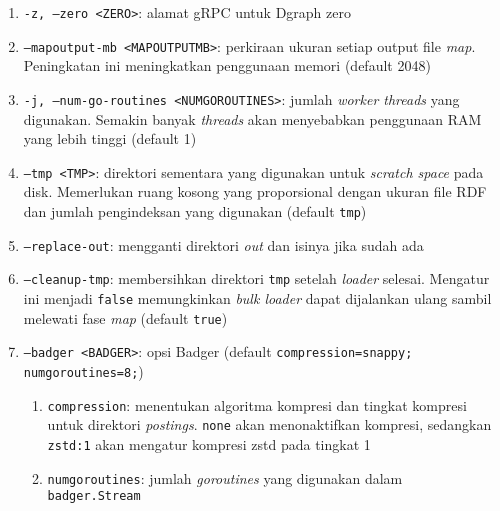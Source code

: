 \begin{enumerate}
\begin{enumerate}
		      \item \texttt{-z, --zero <ZERO>}: alamat gRPC untuk Dgraph zero
		      \item \texttt{--mapoutput-mb <MAPOUTPUT\textunderscore MB>}: perkiraan ukuran setiap output file \textit{map}. Peningkatan ini meningkatkan penggunaan memori (default 2048)
		      \item \texttt{-j, --num-go-routines <NUM\textunderscore GO\textunderscore ROUTINES>}: jumlah \textit{worker threads} yang digunakan. Semakin banyak \textit{threads} akan menyebabkan penggunaan RAM yang lebih tinggi (default 1)
		      \item \texttt{--tmp <TMP>}: direktori sementara yang digunakan untuk \textit{scratch space} pada disk. Memerlukan ruang kosong yang proporsional dengan ukuran file RDF dan jumlah pengindeksan yang digunakan (default \texttt{tmp})
		      \item \texttt{--replace-out}: mengganti direktori \textit{out} dan isinya jika sudah ada
		      \item \texttt{--cleanup-tmp}: membersihkan direktori \texttt{tmp} setelah \textit{loader} selesai. Mengatur ini menjadi \texttt{false} memungkinkan \textit{bulk loader} dapat dijalankan ulang sambil melewati fase \textit{map} (default \texttt{true})
		      \item \texttt{--badger <BADGER>}: opsi Badger (default \texttt{compression=snappy; numgoroutines=8;})
		            \begin{enumerate}
			            \item \texttt{compression}: menentukan algoritma kompresi dan tingkat kompresi untuk direktori \textit{postings}. \texttt{none} akan menonaktifkan kompresi, sedangkan \texttt{zstd:1} akan mengatur kompresi zstd pada tingkat 1
			            \item \texttt{numgoroutines}: jumlah \textit{goroutines} yang digunakan dalam \\\texttt{badger.Stream}
		            \end{enumerate}
	      \end{enumerate}
\end{enumerate}
